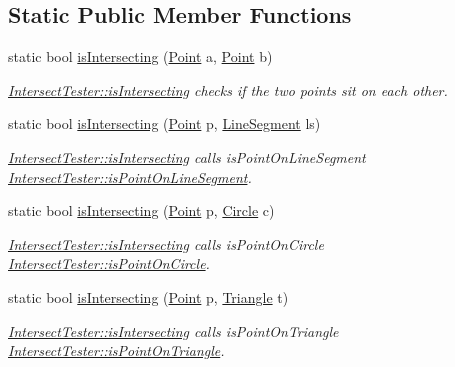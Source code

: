 \subsection*{Static Public Member Functions}
\begin{DoxyCompactItemize}
\item 
static bool \hyperlink{class_intersect_tester_a7710e17ff7d2e229059f23b9429213f5}{is\+Intersecting} (\hyperlink{class_point}{Point} a, \hyperlink{class_point}{Point} b)
\begin{DoxyCompactList}\small\item\em \hyperlink{class_intersect_tester_a7710e17ff7d2e229059f23b9429213f5}{Intersect\+Tester\+::is\+Intersecting} checks if the two points sit on each other. \end{DoxyCompactList}\item 
static bool \hyperlink{class_intersect_tester_acc62b7619356707ae3295e2fab1694ae}{is\+Intersecting} (\hyperlink{class_point}{Point} p, \hyperlink{class_line_segment}{Line\+Segment} ls)
\begin{DoxyCompactList}\small\item\em \hyperlink{class_intersect_tester_a7710e17ff7d2e229059f23b9429213f5}{Intersect\+Tester\+::is\+Intersecting} calls is\+Point\+On\+Line\+Segment  \hyperlink{class_intersect_tester_a95ba0d50e91eb8559aa3c6a4dc0d4c0f}{Intersect\+Tester\+::is\+Point\+On\+Line\+Segment}. \end{DoxyCompactList}\item 
static bool \hyperlink{class_intersect_tester_a12df0518a663c87dcfcc299e9cd6c07f}{is\+Intersecting} (\hyperlink{class_point}{Point} p, \hyperlink{class_circle}{Circle} c)
\begin{DoxyCompactList}\small\item\em \hyperlink{class_intersect_tester_a7710e17ff7d2e229059f23b9429213f5}{Intersect\+Tester\+::is\+Intersecting} calls is\+Point\+On\+Circle  \hyperlink{class_intersect_tester_a1adb6abbf2f6454b48be18cf5eb69333}{Intersect\+Tester\+::is\+Point\+On\+Circle}. \end{DoxyCompactList}\item 
static bool \hyperlink{class_intersect_tester_afd66862467239ef2fd7c79114c960dc6}{is\+Intersecting} (\hyperlink{class_point}{Point} p, \hyperlink{class_triangle}{Triangle} t)
\begin{DoxyCompactList}\small\item\em \hyperlink{class_intersect_tester_a7710e17ff7d2e229059f23b9429213f5}{Intersect\+Tester\+::is\+Intersecting} calls is\+Point\+On\+Triangle  \hyperlink{class_intersect_tester_a04fb92f5e4c68c3f3a91321b94c6011f}{Intersect\+Tester\+::is\+Point\+On\+Triangle}. \end{DoxyCompactList}\item 

\end{DoxyCompactItemize}
